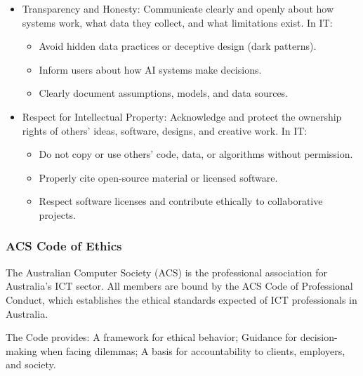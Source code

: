 \begin{itemize}
\begin{itemize}
        \end{itemize}
    \item Transparency and Honesty: Communicate clearly and openly about how systems work, what data they collect, and what limitations exist. In IT:
        \begin{itemize}
            \item Avoid hidden data practices or deceptive design (dark patterns).
            \item Inform users about how AI systems make decisions.
            \item Clearly document assumptions, models, and data sources.
        \end{itemize}
    \item Respect for Intellectual Property: Acknowledge and protect the ownership rights of others’ ideas, software, designs, and creative work. In IT:
        \begin{itemize}
            \item Do not copy or use others’ code, data, or algorithms without permission.
            \item Properly cite open-source material or licensed software.
            \item Respect software licenses and contribute ethically to collaborative projects.
        \end{itemize}
\end{itemize}

\subsubsection{ACS Code of Ethics}

\indent 

The Australian Computer Society (ACS) is the professional association 
for Australia’s ICT sector. All members are bound by the ACS Code of Professional Conduct, which establishes the ethical standards expected of ICT professionals in Australia.

The Code provides: A framework for ethical behavior; Guidance for decision-making when facing dilemmas; A basis for accountability to clients, employers, and society.

